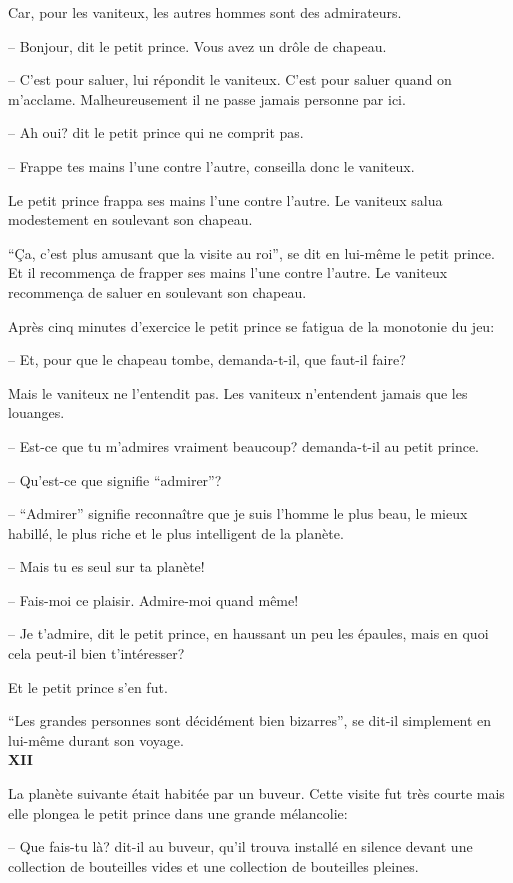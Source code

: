 \begin{Parallel}[p]{}{}
{Car, pour les vaniteux, les autres hommes sont des admirateurs.

-- Bonjour, dit le petit prince. Vous avez un drôle de chapeau.

-- C'est pour saluer, lui répondit le vaniteux. C'est
pour saluer quand on m'acclame. Malheureusement il ne
passe jamais personne par ici.

-- Ah oui? dit le petit prince qui ne comprit pas.

-- Frappe tes mains l'une contre l'autre, conseilla donc le vaniteux.

Le petit prince frappa ses mains l'une contre l'autre. Le vaniteux salua
modestement en soulevant son chapeau.

``Ça, c'est plus amusant que la visite au roi'', se
dit en lui-même le petit prince. Et il recommença de frapper ses mains l'une contre l'autre.
Le vaniteux recommença de saluer en soulevant son chapeau.

Après cinq minutes d'exercice le petit prince
se fatigua de la monotonie du jeu:

-- Et, pour que le chapeau tombe, demanda-t-il,
que faut-il faire?

Mais le vaniteux ne l'entendit pas. Les vaniteux
n'entendent jamais que les louanges.

-- Est-ce que tu m'admires vraiment beaucoup?
demanda-t-il au petit prince.

-- Qu'est-ce que signifie ``admirer''?

-- ``Admirer'' signifie reconnaître que je suis
l'homme le plus beau, le mieux habillé, le plus riche
et le plus intelligent de la planète.

-- Mais tu es seul sur ta planète!

-- Fais-moi ce plaisir. Admire-moi quand même!

-- Je t'admire, dit le petit prince, en haussant un
peu les épaules, mais en quoi cela peut-il bien t'intéresser?

Et le petit prince s'en fut.

``Les grandes personnes sont décidément bien
bizarres'', se dit-il simplement en lui-même durant
son voyage.\\

\textbf{XII}

La planète suivante était habitée par un buveur.
Cette visite fut très courte mais elle plongea le petit
prince dans une grande mélancolie:

-- Que fais-tu là? dit-il au buveur, qu'il trouva installé en silence devant une collection de bouteilles
vides et une collection de bouteilles pleines.

}
\end{Parallel}
